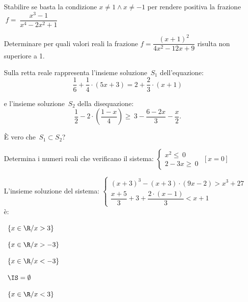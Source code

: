 \begin{esercizio}
 \label{ese:4.73}
Stabilire se basta la condizione \(x\neq 1\wedge x\neq -1\) per rendere 
positiva 
la frazione \(~f=~\dfrac{x^3-1}{x^4-2x^2+1}\)
\end{esercizio}

\begin{esercizio}
 \label{ese:4.74}
Determinare per quali valori reali la frazione 
\(f=\dfrac{(x+1)^2}{4x^2-12x+9}\) 
risulta non superiore a 1.
\end{esercizio}


\begin{esercizio}
 \label{ese:21.33}
Sulla retta reale rappresenta l'insieme soluzione~\(S_{1}\)
dell'equazione:
\[\dfrac{1}{6}+\dfrac{1}{4}\cdot (5x+3)=2+\dfrac{2}{3}\cdot (x+1)\]

e l'insieme soluzione~\(S_{2}\) della disequazione:
\[\dfrac{1}{2}-2\cdot\left(\dfrac{1-x}{4}\right)\ge~3-\dfrac{6-2x}{3}-\dfrac{x
}{2}.\]

È vero che~\(S_{1}\subset S_{2}\)?
\end{esercizio}

\begin{esercizio}[\Ast]
 \label{ese:21.34}
 Determina i numeri reali che verificano il sistema:
 \(\left\{%
  \begin{array}{l}
  x^{2}\le~0
  \\2-3x\ge~0
 \end{array}\right.\)
\hfill \(\left[x = 0\right]\)
 \end{esercizio}

\begin{esercizio}
 \label{ese:21.35}
 L'insieme soluzione del sistema:
\(\left\{\begin{array}{l}
  (x+3)^{3}-(x+3)\cdot (9x-2)>x^{3}+27\\
  \dfrac{x+5}{3}+3+\dfrac{2\cdot (x-1)}{3}<x+1
 \end{array}\right.\) è:
\begin{multicols}{2}
\boxA\quad~\(\left\{x\in \R/x>3\right\}\)

\boxB\quad~\(\left\{x\in \R/x>-3\right\}\)

\boxC\quad~\(\left\{x\in \R/x<-3\right\}\)

\boxD\quad~\(\IS=\emptyset \)

\boxE\quad~\(\left\{x\in\R/x<3\right\}\)
\end{multicols}

\end{esercizio}

